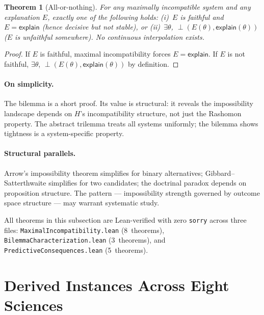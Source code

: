 \documentclass[11pt,a4paper]{article}
\newtheorem{theorem}{Theorem}[section]
\newcommand{\incomp}{\perp}
\begin{document}
\begin{theorem}[All-or-nothing]
\label{thm:all-or-nothing}
For any maximally incompatible system and any explanation $E$, exactly one of the following holds:
(i)~$E$ is faithful and $E = \mathsf{explain}$ (hence decisive but not stable), or
(ii)~$\exists \theta$, $\incomp(E(\theta), \mathsf{explain}(\theta))$ ($E$ is unfaithful somewhere).
No continuous interpolation exists.
\end{theorem}

\begin{proof}
If $E$ is faithful, maximal incompatibility forces $E = \mathsf{explain}$.  If $E$ is not faithful, $\exists \theta$, $\incomp(E(\theta), \mathsf{explain}(\theta))$ by definition.
\end{proof}

\paragraph{On simplicity.} The bilemma is a short proof. Its value is structural: it reveals the impossibility landscape depends on $H$'s incompatibility structure, not just the Rashomon property. The abstract trilemma treats all systems uniformly; the bilemma shows tightness is a system-specific property.

\paragraph{Structural parallels.} Arrow's impossibility theorem simplifies for binary alternatives; Gibbard--Satterthwaite simplifies for two candidates; the doctrinal paradox depends on proposition structure. The pattern --- impossibility strength governed by outcome space structure --- may warrant systematic study.

All theorems in this subsection are Lean-verified with zero
\texttt{sorry} across three files: \texttt{MaximalIncompatibility.lean} (8~theorems), \texttt{BilemmaCharacterization.lean} (3~theorems), and \texttt{PredictiveConsequences.lean} (5~theorems).

\section{Derived Instances Across Eight Sciences}
\label{sec:derived-instances}
\end{document}
